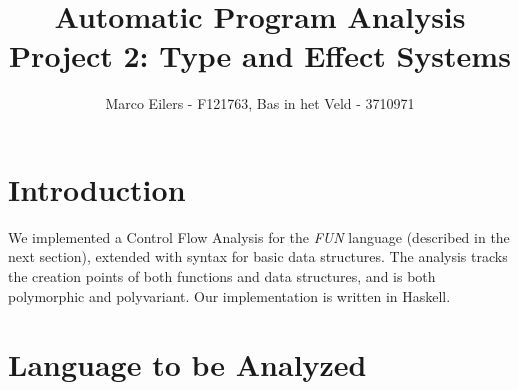\documentclass[a4paper,11pt]{article}
\begin{document}
\title{Automatic Program Analysis\\Project 2: Type and Effect Systems}
\author{Marco Eilers - F121763, Bas in het Veld - 3710971}

\maketitle

\section{Introduction}
We implemented a Control Flow Analysis for the \emph{FUN} language (described in the next section), extended with syntax for basic data structures. The analysis tracks the creation points of both functions and data structures, and is both polymorphic and polyvariant. Our implementation is written in Haskell. 

\section{Language to be Analyzed}
\end{document}
